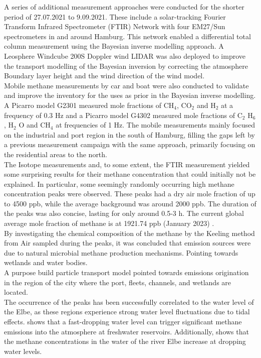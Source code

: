 A series of additional measurement approaches were conducted for the shorter period of 27.07.2021 to 9.09.2021. These include a solar-tracking Fourier Transform Infrared Spectrometer (FTIR) Network with four EM27/Sun spectrometers in and around Hamburg. This network enabled a differential total column measurement using the Bayesian inverse modelling approach. A Leosphere Windcube 200S Doppler wind LIDAR was also deployed to improve the transport modelling of the Bayesian inversion by correcting the atmosphere Boundary layer height and the wind direction of the wind model. \\
Mobile methane measurements by car and boat were also conducted to validate and improve the inventory for the uses as prior in the Bayesian inverse modelling.  A Picarro model G2301 measured mole fractions of CH$_4$, CO$_2$ and H$_2$ at a frequency of 0.3 Hz and a Picarro model G4302 measured mole fractions of C$_2$ H$_6$, H$_2$ O and CH$_4$ at frequencies of 1 Hz. The mobile measurements mainly focused on the industrial and port region in the south of Hamburg, filling the gaps left by a previous measurement campaign with the same approach, primarily focusing on the residential areas to the north.\\
The Isotope measurements and, to some extent, the FTIR measurement yielded some surprising results for their methane concentration that could initially not be explained. In particular, some seemingly randomly occurring high methane concentration peaks were observed. These peaks had a dry air mole fraction of up to 4500 ppb, while the average background was around 2000 ppb. The duration of the peaks was also concise, lasting for only around 0.5-3 h. The current global average mole fraction of methane is at 1921.74 ppb (January 2023) \cite{Lan.2022}.\\
By investigating the chemical composition of the methane by the Keeling method from Air sampled during the peaks, it was concluded that emission sources were due to natural microbial methane production mechanisms. Pointing towards wetlands and water bodies.\\
A purpose build particle transport model pointed towards emissions origination in the region of the city where the port, fleets, channels, and wetlands are located. \\
The occurrence of the peaks has been successfully correlated to the water level of the Elbe, as these regions experience strong water level fluctuations due to tidal effects. \cite{Harrison.2017} shows that a fast-dropping water level can trigger significant methane emissions into the atmosphere at freshwater reservoirs. Additionally, \cite{Matousu.2019} shows that the methane concentrations in the water of the river Elbe increase at dropping water levels.\\
